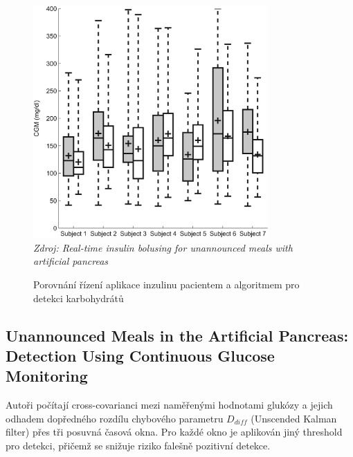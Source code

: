 \begin{figure}[H]
\caption{Porovnání řízení aplikace inzulinu pacientem a algoritmem pro detekci karbohydrátů}
\label{fig:turksoy2}
\centering
\includegraphics[width=0.8\textwidth]{img/analyza/turksoy3.jpg}\\
\textit{Zdroj: Real-time insulin bolusing for unannounced meals with artificial pancreas \citep{Analyza.Turksoy}}
\end{figure}


\subsection{Unannounced Meals in the Artificial Pancreas: Detection Using Continuous Glucose Monitoring}
\label{ch:CrossCovariance}

Autoři \citet{Analyza.CrossCovariance} počítají cross-covarianci mezi naměřenými hodnotami glukózy a jejich odhadem dopředného rozdílu chybového parametru $D_{diff}$ (Unscended Kalman filter) přes tři posuvná časová okna. Pro každé okno je aplikován jiný threshold pro detekci, přičemž se snižuje riziko falešně pozitivní detekce.

